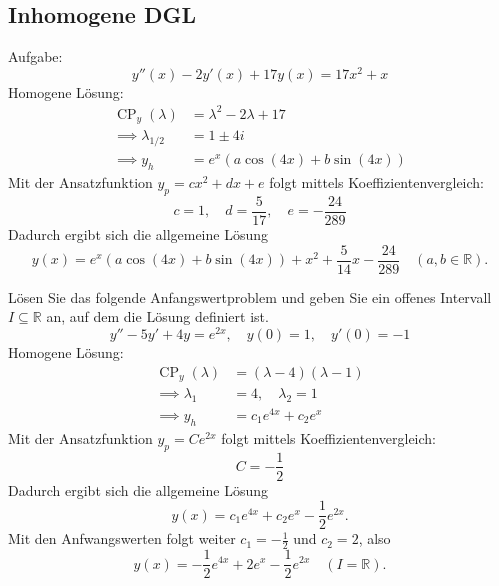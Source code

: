 \documentclass[parskip=full]{scrartcl}
\DeclareMathOperator{\cp}{CP}
\begin{document}
\subsection{Inhomogene DGL}
Aufgabe:
\begin{displaymath}
  y''(x) - 2y'(x) + 17y(x) = 17x^2 + x
\end{displaymath}
Homogene Lösung:
\begin{align*}
  \cp_y(\lambda) &= \lambda^2 - 2\lambda + 17\\
  \implies \lambda_{1/2} &= 1 \pm 4i\\
  \implies y_h &= e^x(a \cos(4x) + b \sin(4x))
\end{align*}
Mit der Ansatzfunktion $y_p = cx^2 + dx + e$ folgt mittels Koeffizientenvergleich:
\begin{displaymath}
  c = 1, \quad d = \frac{5}{17}, \quad e = -\frac{24}{289}
\end{displaymath}
Dadurch ergibt sich die allgemeine Lösung
\begin{displaymath}
  y(x) = e^x(a \cos(4x) + b \sin(4x)) + x^2 + \frac{5}{14}x - \frac{24}{289} \quad (a,b \in \mathbb{R}).
\end{displaymath}

Lösen Sie das folgende Anfangswertproblem und geben Sie ein offenes Intervall $I \subseteq \mathbb{R}$ an, auf dem die Lösung definiert ist.
\begin{displaymath}
  y'' - 5y' + 4y = e^{2x}, \quad y(0) = 1, \quad y'(0) = -1
\end{displaymath}
Homogene Lösung:
\begin{align*}
  \cp_y(\lambda) &= (\lambda - 4)(\lambda - 1)\\
  \implies \lambda_1 &= 4, \quad \lambda_2 = 1\\
  \implies y_h &= c_1 e^{4x} + c_2 e^{x}
\end{align*}
Mit der Ansatzfunktion $y_p = Ce^{2x}$ folgt mittels Koeffizientenvergleich:
\begin{displaymath}
  C = -\frac{1}{2}
\end{displaymath}
Dadurch ergibt sich die allgemeine Lösung
\begin{displaymath}
  y(x) = c_1 e^{4x} + c_2 e^{x} - \frac{1}{2}e^{2x}.
\end{displaymath}
Mit den Anfwangswerten folgt weiter $c_1 = -\frac{1}{2}$ und $c_2 = 2$, also
\begin{displaymath}
  y(x) = -\frac{1}{2} e^{4x} + 2 e^{x} - \frac{1}{2}e^{2x} \quad (I = \mathbb{R}).
\end{displaymath}
\end{document}
